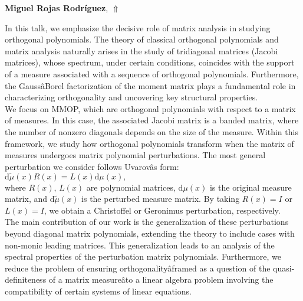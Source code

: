 \documentclass[ILAS2025-program.tex]{subfiles}
\begin{document}
\hypertarget{down0402}{}\begin{ilasabstract}
    
\textbf{Miguel Rojas Rodríguez},  \hfill \hyperlink{up0402}{$\Uparrow$}
    
    
\mtskip
    In this talk, we emphasize the decisive role of matrix analysis in studying orthogonal polynomials. The theory of classical orthogonal polynomials and matrix analysis naturally arises in the study of tridiagonal matrices (Jacobi matrices), whose spectrum, under certain conditions, coincides with the support of a measure associated with a sequence of orthogonal polynomials. Furthermore, the GaussâBorel factorization of the moment matrix plays a fundamental role in characterizing orthogonality and uncovering key structural properties. \\
We focus on MMOP, which are orthogonal polynomials with respect to a matrix of measures. In this case, the associated Jacobi matrix is a banded matrix, where the number of nonzero diagonals depends on the size of the measure. Within this framework, we study how orthogonal polynomials transform when the matrix of measures undergoes matrix polynomial perturbations. The most general perturbation we consider follows Uvarovâs form:   \\
    $ \mathrm{d}\tilde{\mu}(x) R(x) = L(x) \mathrm{d} \mu(x),$\\
where $R(x),\,L(x)$ are polynomial matrices, $\mathrm{d} \mu (x)$ is the original measure matrix, and $\mathrm{d} \tilde{\mu}(x)$ is the perturbed measure matrix. By taking $R(x) = I$ or $L(x) = I$, we obtain a Christoffel or Geronimus perturbation, respectively.   \\
The main contribution of our work is the generalization of these perturbations beyond diagonal matrix polynomials, extending the theory to include cases with non-monic leading matrices. This generalization leads to an analysis of the spectral properties of the perturbation matrix polynomials. Furthermore, we reduce the problem of ensuring orthogonalityâframed as a question of the quasi-definiteness of a matrix measureâto a linear algebra problem involving the compatibility of certain systems of linear equations.
\end{ilasabstract}
    
\end{document}
